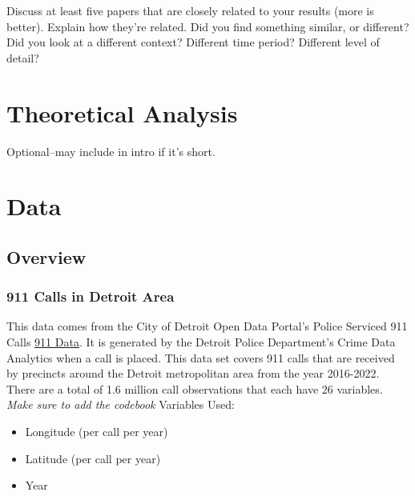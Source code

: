 \documentclass[12pt]{article}
\begin{document}
Discuss at least five papers that are closely related to your results (more is better). Explain how they're related. Did you find something similar, or different? Did you look at a different context? Different time period? Different level of detail?

\section{Theoretical Analysis}
\label{sec:theory}
Optional--may include in intro if it's short.


\section{Data}
\label{sec:data}
\subsection{Overview}
\subsubsection{911 Calls in Detroit Area}
This data comes from the City of Detroit Open Data Portal's Police Serviced 911 Calls  \href{https://data.detroitmi.gov/datasets/detroitmi::police-serviced-911-calls/about}{911 Data}. It is generated by the Detroit Police Department's Crime Data Analytics when a call is placed. This data set covers 911 calls that are received by precincts around the Detroit metropolitan area from the year 2016-2022. There are a total of 1.6 million call observations that each have 26 variables. 
\textit{Make sure to add the codebook}
Variables Used: 
\begin{itemize}
    \item Longitude (per call per year)
    \item Latitude (per call per year)
    \item Year
\end{itemize}
\end{document}
